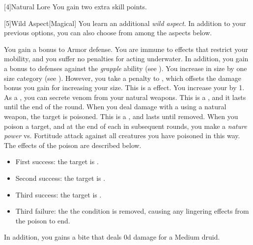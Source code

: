         [4]{Natural Lore}
        You gain two extra skill points.

        [5]{Wild Aspect}[Magical]
        You learn an additional \textit{wild aspect}.
        In addition to your previous options, you can also choose from among the aspects below.
        {
             You gain a  bonus to Armor defense.
             You are immune to effects that restrict your mobility, and you suffer no penalties for acting underwater.
            In addition, you gain a  bonus to defenses against the \textit{grapple} ability (see ).
            You increase in size by one size category (see ).
            However, you take a  penalty to , which offsets the damage bonus you gain for increasing your size.
            This is a  effect.
            You increase your  by 1.
            As a , you can secrete venom from your natural weapons.
            This is a , and it lasts until the end of the round.
            When you deal damage with a  using a natural weapon, the target is poisoned.
            This is a , and lasts until removed.
            When you poison a target, and at the end of each  in subsequent rounds, you make a \textit{nature power} vs. Fortitude attack against all creatures you have poisoned in this way.
            The effects of the poison are described below.
            \begin{itemize}
                \item First success: the target is \sickened.
                \item Second success: the target is \nauseated.
                \item Third success: the target is \paralyzed.
                \item Third failure: the the condition is removed, causing any lingering effects from the poison to end.
            \end{itemize}
            \par In addition, you gains a bite  that deals \plus0d damage for a Medium druid.
        }


